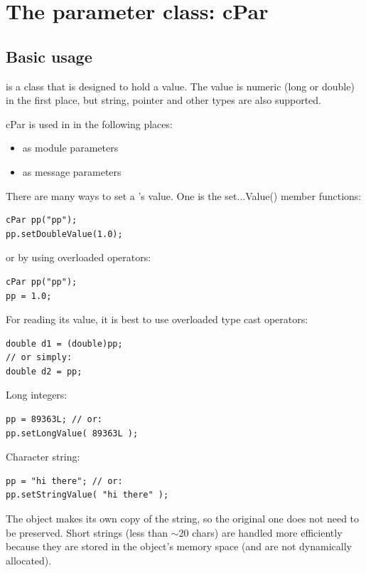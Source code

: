 \section{The parameter class: cPar}

\subsection{Basic usage}

 is a class that is designed to hold a value. The value
is numeric (long or double) in the first place, but string, pointer
and other types are also supported.

cPar is used in {\opp} in the following places:

\begin{itemize}
  \item{as module parameters}
  \item{as message parameters}
\end{itemize}

There are many ways to set a 's value. One is the set...Value()
member functions:

\begin{verbatim}
cPar pp("pp");
pp.setDoubleValue(1.0);
\end{verbatim}


or by using overloaded operators:

\begin{verbatim}
cPar pp("pp");
pp = 1.0;
\end{verbatim}


For reading its value, it is best to use overloaded type cast
operators:

\begin{verbatim}
double d1 = (double)pp;
// or simply:
double d2 = pp;
\end{verbatim}

Long integers:

\begin{verbatim}
pp = 89363L; // or:
pp.setLongValue( 89363L );
\end{verbatim}

Character string:

\begin{verbatim}
pp = "hi there"; // or:
pp.setStringValue( "hi there" );
\end{verbatim}


The  object makes its own copy of the string, so the
original one does not need to be preserved. Short strings (less than
\ensuremath{\sim}20 chars) are handled more efficiently because they
are stored in the object's memory space (and are not dynamically
allocated).

